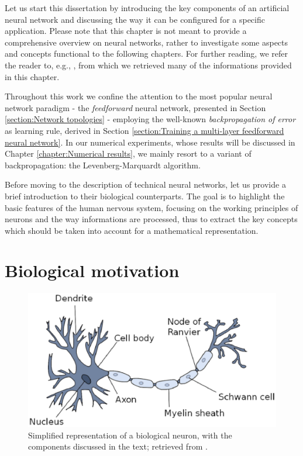 \documentclass[12pt, a4paper, twoside, openright, notitlepage]{report}
\numberwithin{equation}{chapter}
\theoremstyle{theorem}
\theoremstyle{definition}
\theoremstyle{remark}
\theoremstyle{proposition}
\numberwithin{figure}{chapter}
\begin{document}
		Let us start this dissertation by introducing the key components of an artificial neural network and discussing the way it can be configured for a specific application. Please note that this chapter is not meant to provide a comprehensive overview on neural networks, rather to investigate some aspects and concepts functional to the following chapters. For further reading, we refer the reader to, e.g., \cite{Hag14, Hay05, Kri07}, from which we retrieved many of the informations provided in this chapter.
		
		Throughout this work we confine the attention to the most popular neural network paradigm - the \emph{feedforward} neural network, presented in Section \ref{section:Network topologies} - employing the well-known \emph{backpropagation of error} as learning rule, derived in Section \ref{section:Training a multi-layer feedforward neural network}. In our numerical experiments, whose results will be discussed in Chapter \ref{chapter:Numerical results}, we mainly resort to a variant of backpropagation: the Levenberg-Marquardt algorithm.
		
		Before moving to the description of technical neural networks, let us provide a brief introduction to their biological counterparts. The goal is to highlight the basic features of the human nervous system, focusing on the working principles of neurons and the way informations are processed, thus to extract the key concepts which should be taken into account for a mathematical representation.
		
	\vspace*{0.3cm} 
		
	\section{Biological motivation}
	\label{section:Biological motivation} 
	
		\begin{figure}[t]
			\center
			\includegraphics[scale = 0.5]{neuron.eps}
			
			\caption{Simplified representation of a biological neuron, with the components discussed in the text; retrieved from \cite{Kri07}.}
			\label{fig:neuron}
		\end{figure}
		
\end{document}
